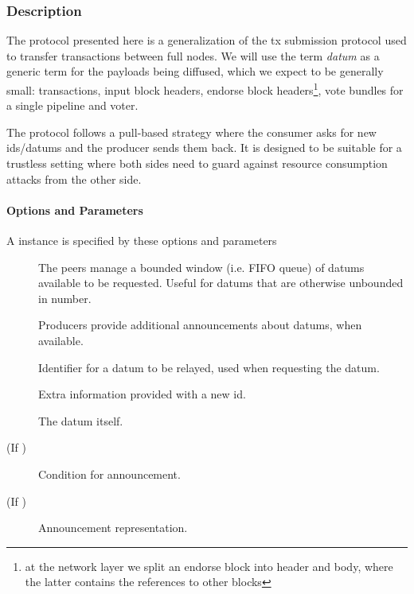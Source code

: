 \subsubsection{Description}
The \relay protocol presented here is a generalization of the tx
submission protocol used to transfer transactions between full
nodes. We will use the term \emph{datum} as a generic term for the
payloads being diffused, which we expect to be generally small:
transactions, input block headers, endorse block headers\footnote{at
the network layer we split an endorse block into header and body,
where the latter contains the references to other blocks}, vote
bundles for a single pipeline and voter.

The protocol follows a pull-based strategy where the consumer asks for
new ids/datums and the producer sends them back. It is designed to be
suitable for a trustless setting where both sides need to guard
against resource consumption attacks from the other side.

\paragraph{Options and Parameters} A \relay{} instance is specified by these options and parameters
\begin{description}
\item [\BoundedWindow] The peers manage a bounded window (i.e. FIFO queue) of datums available to be requested. Useful for datums that are otherwise unbounded in number.
\item [\Announcements] Producers provide additional announcements about datums, when available.
\item [\id{}] Identifier for a datum to be relayed, used when requesting the datum.
\item [\info{}] Extra information provided with a new id.
\item [\datum{}] The datum itself.
\item [\annCond{} (If \Announcements)] Condition for announcement.
\item [\ann{} (If \Announcements)] Announcement representation.
\end{description}

